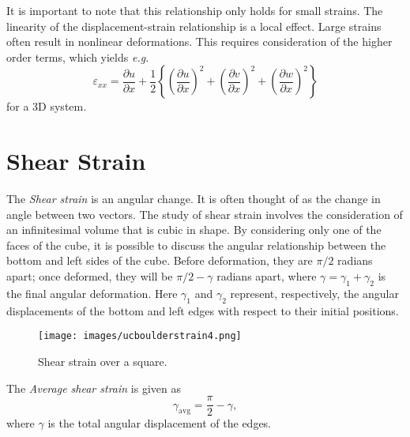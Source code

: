 It is important to note that this relationship only holds for small strains. The linearity of the displacement-strain relationship is a local effect. Large strains often result in nonlinear deformations. This requires consideration of the higher order terms, which yields \emph{e.g.}
\begin{equation}
\label{eq:strain.hot}
\varepsilon_{xx} = \frac{\partial u}{\partial x}+\frac{1}{2}\left\lbrace \left(\frac{\partial u}{\partial x}\right)^2+\left(\frac{\partial v}{\partial x}\right)^2 +\left(\frac{\partial w}{\partial x}\right)^2\right\rbrace
\end{equation}
for a 3D system.

\section{Shear Strain}
The \emph{Shear strain} is an angular change. It is often thought of as the change in angle between two vectors. The study of shear strain involves the consideration of an infinitesimal volume that is cubic in shape. By considering only one of the faces of the cube, it is possible to discuss the angular relationship between the bottom and left sides of the cube. Before deformation, they are $\pi/2$ radians apart; once deformed, they will be $\pi/2-\gamma$ radians apart, where $\gamma = \gamma_1+\gamma_2$ is the final angular deformation. Here $\gamma_1$ and $\gamma_2$ represent, respectively, the angular displacements of the bottom and left edges with respect to their initial positions. 
\begin{figure}[ht!]
\caption[Shear strain over a square.]{Shear strain over a square. \protect{}}
\centering
\texttt{[image: images/ucboulderstrain4.png]}
\label{im:strain.boulder}
\end{figure}

The \emph{Average shear strain} is given as
\begin{equation}
\gamma_{\text{avg}} = \frac{\pi}{2}-\gamma,
\end{equation}
where $\gamma$ is the total angular displacement of the edges.

